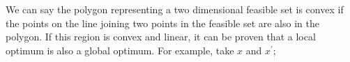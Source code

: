 \documentclass[a4paper, 12pt]{article}
\begin{document}
                We can say the polygon representing a two dimensional feasible set is convex if the points on the line joining two points in the feasible set are also in the polygon.
                If this region is convex and linear, it can be proven that a local optimum is also a global optimum.
                For example, take $x$ and $x^\prime$;
                \begin{center}
                \end{center}
\end{document}
